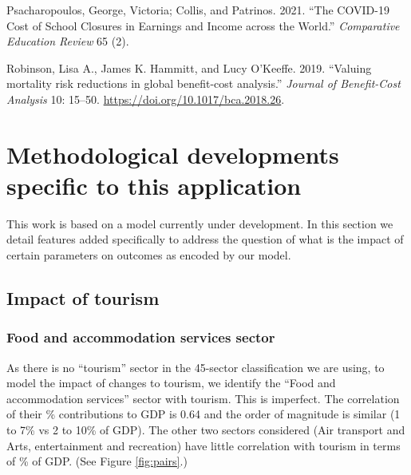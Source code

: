 \documentclass[
]{article}
\newlength{\cslhangindent}
\newlength{\cslentryspacingunit} %
\newenvironment{CSLReferences}[2] %
 {%
  \setlength{\parindent}{0pt}
  \ifodd #1
  \let\oldpar\par
  \def\par{\hangindent=\cslhangindent\oldpar}
  \fi
  \setlength{\parskip}{#2\cslentryspacingunit}
 }%
 {}
\begin{document}
\begin{CSLReferences}{1}{0}
\leavevmode{}%
Psacharopoulos, George, Victoria; Collis, and Patrinos. 2021. {``{The COVID-19 Cost of School Closures in Earnings and Income across the World}.''} \emph{Comparative Education Review} 65 (2).

\leavevmode{}%
Robinson, Lisa A., James K. Hammitt, and Lucy O'Keeffe. 2019. {``{Valuing mortality risk reductions in global benefit-cost analysis}.''} \emph{Journal of Benefit-Cost Analysis} 10: 15--50. \url{https://doi.org/10.1017/bca.2018.26}.

\end{CSLReferences}

\newpage

\hypertarget{methodological-developments-specific-to-this-application}{%
\section{Methodological developments specific to this application}\label{methodological-developments-specific-to-this-application}}

This work is based on a model currently under development. In this section we detail features added specifically to address the question of what is the impact of certain parameters on outcomes as encoded by our model.

\hypertarget{impact-of-tourism}{%
\subsection{Impact of tourism}\label{impact-of-tourism}}

\hypertarget{food-and-accommodation-services-sector}{%
\subsubsection{Food and accommodation services sector}\label{food-and-accommodation-services-sector}}

As there is no ``tourism'' sector in the 45-sector classification we are using, to model the impact of changes to tourism, we identify the ``Food and accommodation services'' sector with tourism. This is imperfect. The correlation of their \% contributions to GDP is 0.64 and the order of magnitude is similar (1 to 7\% vs 2 to 10\% of GDP). The other two sectors considered (Air transport and Arts, entertainment and recreation) have little correlation with tourism in terms of \% of GDP. (See Figure \ref{fig:pairs}.)
\end{document}
